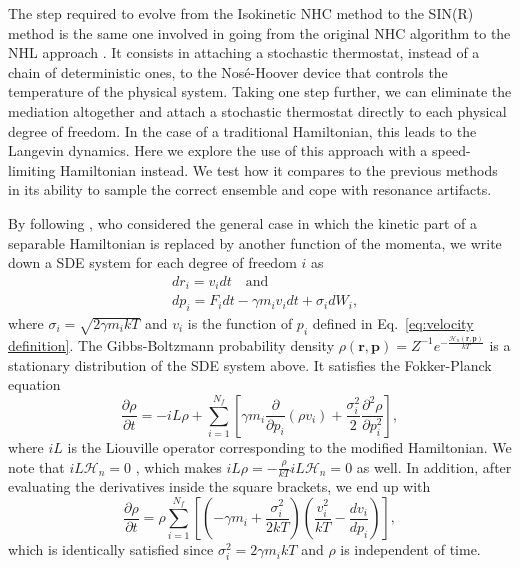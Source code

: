 \documentclass[
aip,
jcp,
reprint,
]{revtex4-1}
\newcommand{\vt}[1]{\boldsymbol{\mathbf{#1}}}          %
\newcommand{\diff}[2]{\frac{\partial #2}{\partial #1}} %
\begin{document}
The step required to evolve from the Isokinetic NHC method \cite{Minary_2004} to the SIN(R) method \cite{Leimkuhler_2013} is the same one involved in going from the original NHC algorithm \cite{Martyna_1992, Martyna_1996} to the NHL approach \cite{Samoletov_2007, Leimkuhler_2009}.
It consists in attaching a stochastic thermostat, instead of a chain of deterministic ones, to the Nos\'{e}-Hoover device that controls the temperature of the physical system.
Taking one step further, we can eliminate the mediation altogether and attach a stochastic thermostat directly to each physical degree of freedom.
In the case of a traditional Hamiltonian, this leads to the Langevin dynamics.
Here we explore the use of this approach with a speed-limiting Hamiltonian instead.
We test how it compares to the previous methods in its ability to sample the correct ensemble and cope with resonance artifacts.

By following \citeauthor{Stoltz_2018} \cite{Stoltz_2018}, who considered the general case in which the kinetic part of a separable Hamiltonian is replaced by another function of the momenta, we write down a SDE system for each degree of freedom $i$ as
\begin{subequations}
	\label{eq:Langevin equations}
	\begin{align}
	&dr_i = v_i dt \quad \mathrm{and} \\
	&dp_i = F_i dt - \gamma m_i v_i dt + \sigma_i dW_i,
	\end{align}
\end{subequations}
where $\sigma_i = \sqrt{2 \gamma m_i kT}$ and $v_i$ is the function of $p_i$ defined in Eq.~\eqref{eq:velocity definition}.
The Gibbs-Boltzmann probability density $\rho(\vt r, \vt p) = {Z}^{-1} e^{-\frac{\mathcal{H}_n(\vt r, \vt p)}{kT}}$ is a stationary distribution of the SDE system above.
It satisfies the Fokker-Planck equation \cite{Leimkuhler_2015}
\begin{equation}
\diff{t}{\rho} = -i\!L \rho + \sum_{i=1}^{N_f} \left[ \gamma m_i \diff{p_i}{}(\rho v_i) + \frac{\sigma_i^2}{2} \diff{p_i^2}{^2 \rho} \right],
\end{equation}
where $i\!L$ is the Liouville operator corresponding to the modified Hamiltonian.
We note that $i\!L \mathcal{H}_n = 0$ \cite{Tuckerman_2010}, which makes $i\!L \rho = -\frac{\rho}{kT}i\!L \mathcal{H}_n = 0$ as well.
In addition, after evaluating the derivatives inside the square brackets, we end up with
\begin{equation}
\diff{t}{\rho} = \rho \sum_{i=1}^{N_f} \left[ \left(-\gamma m_i + \frac{\sigma_i^2}{2 kT}\right) \left(\frac{v_i^2}{kT} - \frac{d v_i}{d p_i}\right) \right],
\end{equation}
which is identically satisfied since $\sigma_i^2 = 2 \gamma m_i kT$ and $\rho$ is independent of time.
\end{document}
